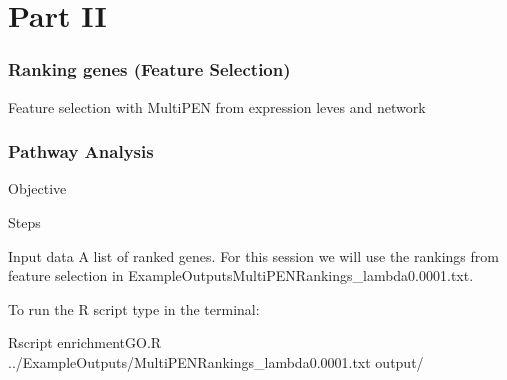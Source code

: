 \documentclass[11pt, oneside]{article}   	%
\begin{document}
\part{Part II}
\section{Ranking genes (Feature Selection)} 

Feature selection with MultiPEN from expression leves and network 


\section{Pathway Analysis}

Objective

Steps

Input data
A list of ranked genes. For this session we will use the rankings from feature selection in ExampleOutputs\/MultiPEN\-Rankings\_lambda0.0001.txt.

To run the R script type in the terminal:

Rscript enrichmentGO.R ../ExampleOutputs/MultiPEN\-Rankings\_lambda0.0001.txt output/







%

\end{document}
